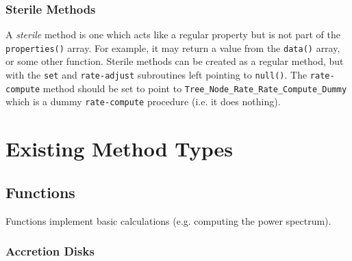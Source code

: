 \subsubsection{Sterile Methods}

A \emph{sterile} method is one which acts like a regular property but is not part of the {\tt properties()} array. For example, it may return a value from the {\tt data()} array, or some other function. Sterile methods can be created as a regular method, but with the {\tt set} and {\tt rate-adjust} subroutines left pointing to {\tt null()}. The {\tt rate-compute} method should be set to point to {\tt Tree\_Node\_Rate\_Rate\_Compute\_Dummy} which is a dummy {\tt rate-compute} procedure (i.e. it does nothing).

\section{Existing Method Types}

\subsection{Functions}

Functions implement basic calculations (e.g. computing the power spectrum).

\subsubsection{Accretion Disks}\label{sec:AccretionDisks}


